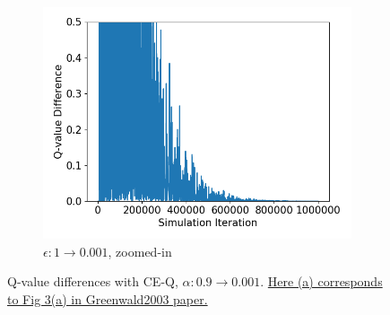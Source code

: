 \documentclass[10pt]{article}
\begin{document}
\begin{figure}[H]
\begin{subfigure}[b]{0.245\linewidth}
  \centering
  \includegraphics[width=\linewidth]{../figs/Qdifference_9.png}
      \caption{$\epsilon:1\rightarrow0.001$, zoomed-in}
  \label{fig:ceQ_0001_cut}
  \end{subfigure}
  \caption{Q-value differences with CE-Q, $\alpha:0.9\rightarrow0.001$. \ul{Here (a) corresponds to Fig 3(a) in Greenwald2003 paper.}\cite{GreenwaldCorrelatedQLearning2003}}
  \label{fig:ceQ}
\end{figure}








\end{document}
